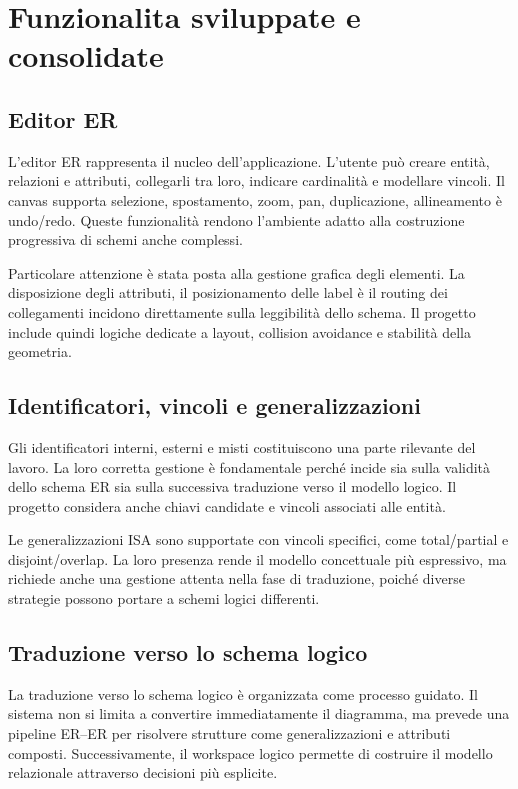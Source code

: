 \documentclass{unipd-thesis-modern}
\begin{document}
\chapter{Funzionalita sviluppate e consolidate}

\section{Editor ER}

L'editor ER rappresenta il nucleo dell'applicazione. L'utente può creare entità, relazioni e attributi, collegarli tra loro, indicare cardinalità e modellare vincoli. Il canvas supporta selezione, spostamento, zoom, pan, duplicazione, allineamento è undo/redo. Queste funzionalità rendono l'ambiente adatto alla costruzione progressiva di schemi anche complessi.

Particolare attenzione è stata posta alla gestione grafica degli elementi. La disposizione degli attributi, il posizionamento delle label è il routing dei collegamenti incidono direttamente sulla leggibilità dello schema. Il progetto include quindi logiche dedicate a layout, collision avoidance e stabilità della geometria.

\section{Identificatori, vincoli e generalizzazioni}

Gli identificatori interni, esterni e misti costituiscono una parte rilevante del lavoro. La loro corretta gestione è fondamentale perché incide sia sulla validità dello schema ER sia sulla successiva traduzione verso il modello logico. Il progetto considera anche chiavi candidate e vincoli associati alle entità.

Le generalizzazioni ISA sono supportate con vincoli specifici, come total/partial e disjoint/overlap. La loro presenza rende il modello concettuale più espressivo, ma richiede anche una gestione attenta nella fase di traduzione, poiché diverse strategie possono portare a schemi logici differenti.

\section{Traduzione verso lo schema logico}

La traduzione verso lo schema logico è organizzata come processo guidato. Il sistema non si limita a convertire immediatamente il diagramma, ma prevede una pipeline ER--ER per risolvere strutture come generalizzazioni e attributi composti. Successivamente, il workspace logico permette di costruire il modello relazionale attraverso decisioni più esplicite.
\end{document}
